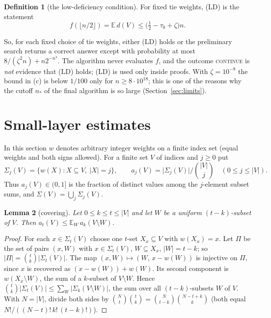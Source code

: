 \documentclass[11pt]{article}
\newtheorem{lemma}{Lemma}[section]
\theoremstyle{definition}
\newtheorem{definition}[lemma]{Definition}
\newcommand{\E}{\mathbb E}
\newcommand{\abs}[1]{\lvert #1\rvert}
\newcommand{\floor}[1]{\lfloor #1\rfloor}
\begin{document}
\begin{definition}[the low-deficiency condition]\label{def:LD}
For fixed tie weights, \textup{(LD)} is the statement
\begin{equation}\label{eq:LD}
 f(\floor{n/2})=\E\,d(V)\le\bigl(\tfrac12-\tau_0+\zeta\bigr)n .\tag{LD}
\end{equation}
\end{definition}
So, for each fixed choice of tie weights, either \textup{(LD)} holds or the preliminary search returns a correct
answer except with probability at most $8/(\zeta^2n)+n2^{-n^3}$. The algorithm never evaluates $f$, and the outcome
\textsc{continue} is \emph{not} evidence that \textup{(LD)} holds; \textup{(LD)} is used only inside proofs.
With $\zeta=10^{-8}$ the bound in (c) is below $1/100$ only for $n\ge8\cdot10^{18}$; this is one of the reasons why
the cutoff $n_\ast$ of the final algorithm is so large (Section~\ref{sec:limits}).
\section{Small-layer estimates}\label{sec:layers}
In this section $w$ denotes arbitrary integer weights on a finite index set (equal weights and both signs allowed).
For a finite set $V$ of indices and $j\ge0$ put
\[
 \Sigma_j(V)=\{w(X):X\subseteq V,\ \abs X=j\},\qquad a_j(V)=\abs{\Sigma_j(V)}\Big/\binom{\abs V}{j}\quad(0\le j\le\abs V).
\]
Thus $a_j(V)\in(0,1]$ is the fraction of distinct values among the $j$-element subset sums, and
$\Sigma(V)=\bigcup_j\Sigma_j(V)$.

\begin{lemma}[covering]\label{lem:cover}
Let $0\le k\le t\le\abs V$ and let $W$ be a uniform $(t-k)$-subset of $V$. Then $a_t(V)\le\E_W\,a_k(V\setminus W)$.
\end{lemma}
\begin{proof}
For each $x\in\Sigma_t(V)$ choose one $t$-set $X_x\subseteq V$ with $w(X_x)=x$. Let $\Pi$ be the set of pairs
$(x,W)$ with $x\in\Sigma_t(V)$, $W\subseteq X_x$, $\abs W=t-k$; so $\abs\Pi=\binom tk\abs{\Sigma_t(V)}$. The map
$(x,W)\mapsto(W,\,x-w(W))$ is injective on $\Pi$, since $x$ is recovered as $(x-w(W))+w(W)$. Its second component
is $w(X_x\setminus W)$, the sum of a $k$-subset of $V\setminus W$. Hence
$\binom tk\abs{\Sigma_t(V)}\le\sum_{W}\abs{\Sigma_k(V\setminus W)}$, the sum over all $(t-k)$-subsets $W$ of $V$. With
$N=\abs V$, divide both sides by $\binom Nt\binom tk=\binom N{t-k}\binom{N-t+k}{k}$ (both equal
$N!/((N-t)!\,k!\,(t-k)!)$).
\end{proof}
\end{document}
